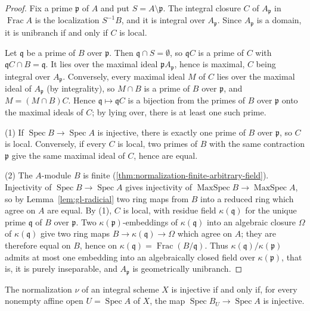 \begin{proof}
Fix a prime $\mathfrak p$ of $A$ and put $S=A\setminus\mathfrak p$. The integral closure $C$ of
$A_{\mathfrak p}$ in $\operatorname{Frac}A$ is the localization $S^{-1}B$, and it is integral over
$A_{\mathfrak p}$. Since $A_{\mathfrak p}$ is a domain, it is unibranch if and only if $C$ is
local.

Let $\mathfrak q$ be a prime of $B$ over $\mathfrak p$. Then $\mathfrak q\cap S=\emptyset$, so
$\mathfrak qC$ is a prime of $C$ with $\mathfrak qC\cap B=\mathfrak q$. It lies over the maximal
ideal $\mathfrak pA_{\mathfrak p}$, hence is maximal, $C$ being integral over $A_{\mathfrak p}$.
Conversely, every maximal ideal $M$ of $C$ lies over the maximal ideal of $A_{\mathfrak p}$ (by
integrality), so $M\cap B$ is a prime of $B$ over $\mathfrak p$, and $M=(M\cap B)C$. Hence
$\mathfrak q\mapsto\mathfrak qC$ is a bijection from the primes of $B$ over $\mathfrak p$ onto the
maximal ideals of $C$; by lying over, there is at least one such prime.

(1) If $\operatorname{Spec}B\to\operatorname{Spec}A$ is injective, there is exactly one prime of
$B$ over $\mathfrak p$, so $C$ is local. Conversely, if every $C$ is local, two primes of $B$
with the same contraction $\mathfrak p$ give the same maximal ideal of $C$, hence are equal.

(2) The $A$-module $B$ is finite (\ref{thm:normalization-finite-arbitrary-field}). Injectivity of
$\operatorname{Spec}B\to\operatorname{Spec}A$ gives injectivity of
$\operatorname{MaxSpec}B\to\operatorname{MaxSpec}A$, so by Lemma~\ref{lem:gl-radicial} two ring
maps from $B$ into a reduced ring which agree on $A$ are equal. By (1), $C$ is local, with residue
field $\kappa(\mathfrak q)$ for the unique prime $\mathfrak q$ of $B$ over $\mathfrak p$. Two
$\kappa(\mathfrak p)$-embeddings of $\kappa(\mathfrak q)$ into an algebraic closure $\Omega$ of
$\kappa(\mathfrak q)$ give two ring maps $B\to\kappa(\mathfrak q)\to\Omega$ which agree on $A$;
they are therefore equal on $B$, hence on $\kappa(\mathfrak q)=\operatorname{Frac}(B/\mathfrak q)$.
Thus $\kappa(\mathfrak q)/\kappa(\mathfrak p)$ admits at most one embedding into an algebraically
closed field over $\kappa(\mathfrak p)$, that is, it is purely inseparable, and $A_{\mathfrak p}$
is geometrically unibranch.
\end{proof}

\begin{lemma}\label{lem:var-unibranch-affine}
\leanok
{}
The normalization $\nu$ of an integral scheme $X$ is injective if and only if, for every nonempty
affine open $U=\operatorname{Spec}A$ of $X$, the map $\operatorname{Spec}B_U\to\operatorname{Spec}A$
is injective.
\end{lemma}


